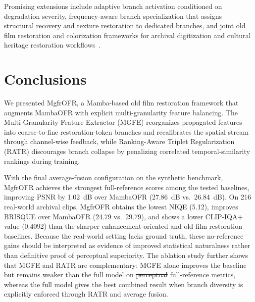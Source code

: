 \documentclass[symmetry,article,submit,pdftex,moreauthors]{Definitions/mdpi}
\providecommand{\DIFadd}[1]{{\protect\color{blue}\uwave{#1}}} %
\providecommand{\DIFdel}[1]{{\protect\color{red}\sout{#1}}}                      %
\providecommand{\DIFaddbegin}{} %
\providecommand{\DIFaddend}{} %
\providecommand{\DIFdelbegin}{} %
\providecommand{\DIFdelend}{} %
\begin{document}
Promising extensions include adaptive branch activation conditioned on degradation severity, frequency-aware branch specialization that assigns structural recovery and texture restoration to dedicated branches, and joint old film restoration and colorization frameworks for archival digitization and cultural heritage restoration workflows~\cite{kokaram2004missing}.
\section{Conclusions}
\label{sec:conclusion}

We presented MgfrOFR, a Mamba-based old film restoration framework that augments MambaOFR with explicit multi-granularity feature balancing. The Multi-Granularity Feature Extractor (MGFE) reorganizes propagated features into coarse-to-fine restoration-token branches and recalibrates the spatial stream through channel-wise feedback, while Ranking-Aware Triplet Regularization (RATR) discourages branch collapse by penalizing correlated temporal-similarity rankings during training.

With the final average-fusion configuration on the synthetic benchmark, MgfrOFR achieves the strongest full-reference scores among the tested baselines, improving PSNR by 1.02~dB over MambaOFR (27.86~dB vs.\ 26.84~dB). On 216 real-world archival clips, MgfrOFR obtains the lowest NIQE (5.12), improves BRISQUE over MambaOFR (24.79 vs.\ 29.79), and shows a lower CLIP-IQA+ value (0.4092) than the sharper enhancement-oriented \DIFaddbegin \DIFadd{references }\DIFaddend and old film restoration baselines. Because the real-world setting lacks ground truth, these no-reference gains should be interpreted as evidence of improved statistical naturalness rather than definitive proof of perceptual superiority. The ablation study further shows that MGFE and RATR are complementary: MGFE alone improves the baseline but remains weaker than the full model on \DIFdelbegin \DIFdel{perceptual }\DIFdelend full-reference \DIFaddbegin \DIFadd{perceptual }\DIFaddend metrics, whereas the full model gives the best combined result when branch diversity is explicitly enforced through RATR and average fusion.
\end{document}
